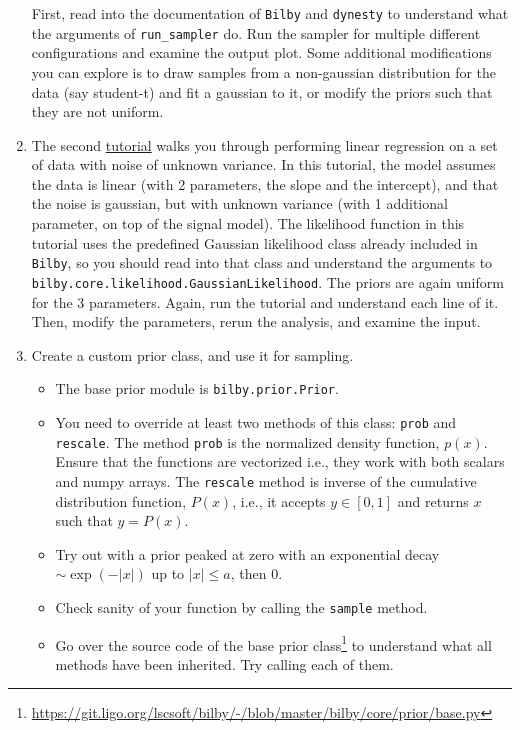 \documentclass[
    aps,
    10pt,
    prd,
    notitlepage,
    onecolumn,s
    tightenlines,
    nofootinbib]{revtex4-1}
\newcommand{\software}[1]{\texttt{#1}}
\begin{document}
\begin{enumerate}
First, read into the documentation of \software{Bilby} and \software{dynesty} to understand what the arguments of \software{run\_sampler} do. 
Run the sampler for multiple different configurations and examine the output plot. 
Some additional modifications you can explore is to draw samples from a non-gaussian distribution for the data (say student-t) and fit a gaussian to it, or modify the priors such that they are not uniform.
\item The second \href{https://git.ligo.org/lscsoft/bilby/-/blob/master/examples/core_examples/linear_regression_unknown_noise.py}{tutorial} walks you through performing linear regression on a set of data with noise of unknown variance.
In this tutorial, the model assumes the data is linear (with 2 parameters, the slope and the intercept), and that the noise is gaussian, but with unknown variance (with 1 additional parameter, on top of the signal model).
The likelihood function in this tutorial uses the predefined Gaussian likelihood class already included in \software{Bilby}, so you should read into that class and understand the arguments to \software{bilby.core.likelihood.GaussianLikelihood}.
The priors are again uniform for the 3 parameters.
Again, run the tutorial and understand each line of it. 
Then, modify the parameters, rerun the analysis, and examine the input.
\item Create a custom prior class, and use it for sampling.
	\begin{itemize}
	\item The base prior module is \texttt{bilby.prior.Prior}.
	\item You need to override at least two methods of this class: \texttt{prob} and \texttt{rescale}.
	      The method \texttt{prob} is the normalized density function, $p(x)$. Ensure that the functions are
	      vectorized i.e., they work with both scalars and numpy arrays. The \texttt{rescale} method is
	      inverse of the cumulative distribution function, $P(x)$, i.e., it accepts $y \in [0, 1]$ and
	      returns $x$ such that $y = P(x)$.
	\item Try out with a prior peaked at zero with an exponential decay $\sim \exp(-\vert x \vert)$ up to
	      $\vert x \vert \leq a$, then $0$.
	\item Check sanity of your function by calling the \texttt{sample} method.
	\item Go over the source code of the base prior class\footnote{\tiny{\url{https://git.ligo.org/lscsoft/bilby/-/blob/master/bilby/core/prior/base.py}}}
	      to understand what all methods have been inherited. Try calling each of them.
	\end{itemize}
\end{enumerate}
\end{document}
